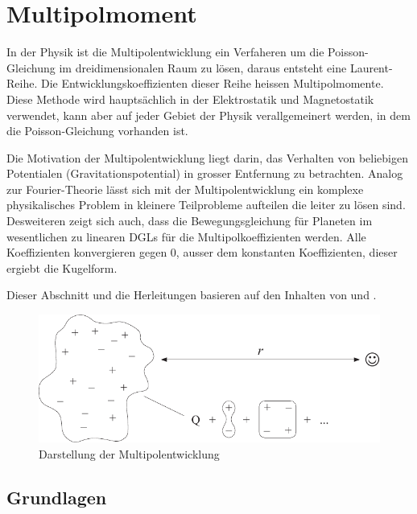 %
%
%
%
\section{Multipolmoment
\label{planet:section:multipol}}
In der Physik ist die Multipolentwicklung ein Verfaheren um die Poisson-Gleichung im dreidimensionalen Raum zu lösen, daraus entsteht eine Laurent-Reihe.
Die Entwicklungskoeffizienten dieser Reihe heissen Multipolmomente.
Diese Methode wird hauptsächlich in der Elektrostatik und Magnetostatik verwendet, kann aber auf jeder Gebiet der Physik verallgemeinert werden, in dem die Poisson-Gleichung vorhanden ist.

Die Motivation der Multipolentwicklung liegt darin, das Verhalten von beliebigen Potentialen (Gravitationspotential) in grosser Entfernung zu betrachten.
Analog zur Fourier-Theorie lässt sich mit der Multipolentwicklung ein komplexe physikalisches Problem in kleinere Teilprobleme aufteilen die leiter zu lösen sind.
Desweiteren zeigt sich auch, dass die Bewegungsgleichung für Planeten im wesentlichen zu linearen DGLs für die Multipolkoeffizienten werden.
Alle Koeffizienten konvergieren gegen 0, ausser dem konstanten Koeffizienten, dieser ergiebt die Kugelform.

Dieser Abschnitt und die Herleitungen basieren auf den Inhalten von \cite{planet:multi} und \cite{planet:quadro}.

\begin{figure}[h!]
    \centering
    \includegraphics[width=\linewidth]{papers/planet/pictures/Multipol.pdf}
    \caption{Darstellung der Multipolentwicklung
        \label{planet:fig:multipol}}
\end{figure}

\subsection{Grundlagen
\label{planet:subsection:grundlagen}}


